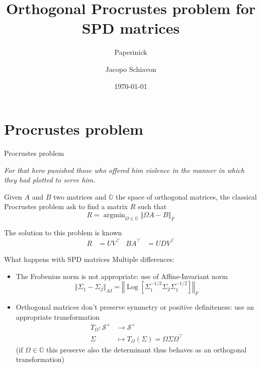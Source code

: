 \documentclass[xcolor=dvipsnames,aspectratio=169]{beamer}
\title{\Large Orthogonal Procrustes problem for SPD matrices}
\subtitle{\large Paperinick}
\author{Jacopo Schiavon}
\date{\today}
\institute[Dep. Statistical Sciences --- UNIPD]{Department of Statistical Sciences\\ University of Padova}
\DeclareMathOperator*{\argmin}{argmin}
\DeclareMathOperator{\logm}{Log}
\newcommand{\norm}[2][]{\left\Vert#2\right\Vert_{#1}}
\begin{document}
    \begin{frame}[plain]
        \maketitle
    \end{frame}

    \section{Procrustes problem}
    \begin{frame}[t]{Procrustes problem}
        \begin{center}
            \itshape
            For that hero punished those who offered him violence in the manner in which they had plotted to serve him.
        \end{center}

        Given $A$ and $B$ two matrices and $\mathbb{O}$ the space of orthogonal matrices, the classical Procrustes problem ask to find a matrix $R$ such that
        \begin{equation*}
            R = \argmin_{\Omega\in\mathbb{O}} \norm[F]{\Omega A - B}
        \end{equation*}

        \pause
        The solution to this problem is known
        \begin{align*}
            R &= UV^\intercal & BA^\intercal &= UDV^\intercal
        \end{align*}

    \end{frame}

    \begin{frame}[t]{What happens with SPD matrices}
        Multiple differences:
        \begin{itemize}
            \item The Frobenius norm is not appropriate: use of Affine-Invariant norm
            \begin{equation*}
                \norm[AI]{\Sigma_1 - \Sigma_2} = \norm[F]{\logm\left[\Sigma_1^{-1/2}\Sigma_2\Sigma_1^{-1/2}\right]}
            \end{equation*}
            \pause\item Orthogonal matrices don't preserve symmetry or positive definiteness: use an appropriate transformation
            \begin{align*}
                T_\Omega\colon \mathcal{S}^+ &\to \mathcal{S}^+\\
                \Sigma &\mapsto T_\Omega(\Sigma) = \Omega\Sigma \Omega^\intercal
            \end{align*}
            (if $\Omega\in\mathbb{O}$ this preserve also the determinant thus behaves as an orthogonal transformation)
        \end{itemize}
    \end{frame}
\end{document}

